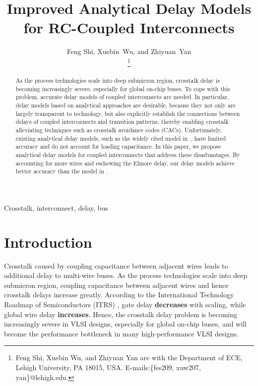 \documentclass[10pt,journal]{IEEEtran}
\begin{document}
\title{Improved Analytical Delay Models for RC-Coupled Interconnects}

\author{Feng Shi, Xuebin~Wu, and Zhiyuan~Yan

  \thanks{Feng Shi, Xuebin Wu, and Zhiyuan
    Yan are with the Department of ECE,
    Lehigh University, PA 18015, USA. E-mails:\{fes209, xuw207,
     yan\}@lehigh.edu.}}








\maketitle
\begin{abstract}
As the process technologies scale into deep submicron region, crosstalk delay is becoming increasingly severe, especially for global on-chip buses. To cope with this problem, accurate delay models of coupled interconnects are needed.
In particular, delay models based on analytical approaches are desirable, because they not only are largely transparent to technology, but also explicitly establish the connections between delays of coupled interconnects and transition patterns, thereby enabling crosstalk alleviating techniques such as crosstalk avoidance codes (CACs).
Unfortunately, existing analytical delay models, such as the widely cited model in~\cite{Sot01}, have limited accuracy and do not account for loading capacitance. In this paper, we propose analytical delay models for coupled interconnects that address these disadvantages.
By accounting for more wires and eschewing the Elmore delay, our delay models achieve better accuracy than the model in \cite{Sot01}.
\end{abstract}
\begin{keywords}
Crosstalk, interconnect, delay, bus
\end{keywords}

\section{Introduction}
\label{sec:intro}
Crosstalk caused by coupling capacitance between adjacent wires leads to additional delay to multi-wire buses. As the process technologies scale into deep submicron region,
coupling capacitance between adjacent wires and hence crosstalk delays increase greatly. According to the International Technology Roadmap
of Semiconductors (ITRS) \cite{ITRS}, gate delay \textbf{decreases} with scaling, while
global wire delay \textbf{increases}. Hence, the crosstalk delay problem is becoming increasingly severe in VLSI designs, especially for global on-chip buses, and will become the performance bottleneck in many high-performance VLSI designs.
\end{document}
